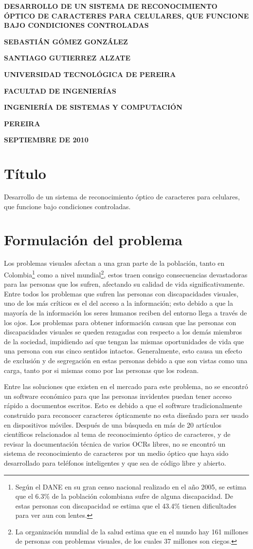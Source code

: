 \documentclass[a4paper, 11pt, oneside]{article}
\newcommand\portada{
	\begin{titlepage}
		\begin{center}
			{\large \bf DESARROLLO DE UN SISTEMA DE RECONOCIMIENTO ÓPTICO DE CARACTERES PARA CELULARES, QUE FUNCIONE BAJO CONDICIONES CONTROLADAS }
			\vfill
			{\large\bf SEBASTIÁN GÓMEZ GONZÁLEZ \par}
			{\large\bf SANTIAGO GUTIERREZ ALZATE \par}
			\vfill
			{\large\bf UNIVERSIDAD TECNOLÓGICA DE PEREIRA  \par}
			{\large\bf FACULTAD DE INGENIERÍAS \par}
			{\large\bf INGENIERÍA DE SISTEMAS Y COMPUTACIÓN \par}
			{\large\bf PEREIRA\par}
			{\large\bf SEPTIEMBRE DE 2010 \par}
		\end{center}
	\end{titlepage}
}
\begin{document}
\portada

	\clearpage
	\section{Título}
	Desarrollo de un sistema de reconocimiento óptico de caracteres para celulares, que funcione bajo condiciones controladas.
	
	\section{Formulación del problema}
	Los problemas visuales afectan a una gran parte de la población, tanto en Colombia\footnote{Según el DANE en su gran censo nacional realizado en el año 2005, se estima que el 6.3\% de la población colombiana sufre de alguna discapacidad. De estas personas con discapacidad se estima que el 43.4\% tienen dificultades para ver aun con lentes.} como a nivel mundial\footnote{La organización mundial de la salud estima que en el mundo hay 161 millones de personas con problemas visuales, de los cuales 37 millones son ciegos.}, estos traen consigo consecuencias devastadoras para las personas que los sufren, afectando su calidad de vida significativamente. Entre todos los problemas que sufren las personas con discapacidades visuales, uno de los más críticos es el del acceso a la información; esto debido a que la mayoría de la información los seres humanos reciben del entorno llega a través de los ojos. Los problemas para obtener información causan que las personas con discapacidades visuales se queden rezagadas con respecto a los demás miembros de la sociedad, impidiendo así que tengan las mismas oportunidades de vida que una persona con sus cinco sentidos intactos. Generalmente, esto causa un efecto de exclusión y de segregación en estas personas debido a que son vistas como una carga, tanto por si mismas como por las personas que los rodean. 
	
	Entre las soluciones que existen en el mercado para este problema, no se encontró un software económico para que las personas invidentes puedan tener acceso rápido a documentos escritos. Esto es debido a que el software tradicionalmente construido para reconocer caracteres ópticamente no esta diseñado para ser usado en dispositivos móviles. Después de una búsqueda en más de 20 artículos científicos relacionados al tema de reconocimiento óptico de caracteres, y de revisar la documentación técnica de varios OCRs libres, no se encontró un sistema de reconocimiento de caracteres por un medio óptico que haya sido desarrollado para teléfonos inteligentes y que sea de código libre y abierto.
\end{document}
